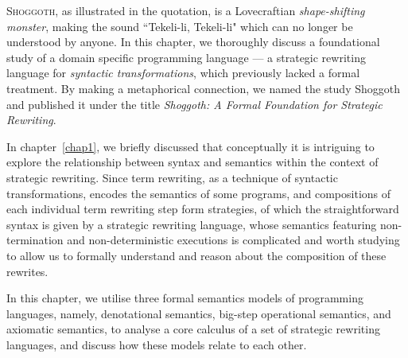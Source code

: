 \noindent
\begin{center}
\vspace{0.3em}
\vspace{-0.7em}
\end{center}
\lettrine{S}{hoggoth}, as illustrated in the quotation, is a Lovecraftian \emph{shape-shifting monster}, making the sound ``Tekeli-li, Tekeli-li" which can no longer be understood by anyone. In this chapter, we thoroughly discuss a foundational study of a domain specific programming language --- a strategic rewriting language for \emph{syntactic transformations}, which previously lacked a formal treatment. By making a metaphorical connection, we named the study Shoggoth and published it under the title \emph{Shoggoth: A Formal Foundation for Strategic Rewriting}.

In chapter~\ref{chap1}, we briefly discussed that conceptually it is intriguing to explore the relationship between syntax and semantics within the context of strategic rewriting. Since term rewriting, as a technique of syntactic transformations, encodes the semantics of some programs, and compositions of each individual term rewriting step form strategies, of which the straightforward syntax is given by a strategic rewriting language, whose semantics featuring non-termination and non-deterministic executions is complicated and worth studying to allow us to formally understand and reason about the composition of these rewrites.

In this chapter, we utilise three formal semantics models of programming languages, namely, denotational semantics, big-step operational semantics, and axiomatic semantics, to analyse a core calculus of a set of strategic rewriting languages, and discuss how these models relate to each other.

